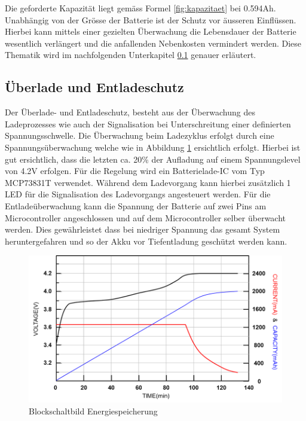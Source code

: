 Die geforderte Kapazität liegt gemäss Formel \ref{fig:kapazitaet} bei 0.594Ah. Unabhängig von der Grösse der Batterie ist der Schutz vor äusseren Einflüssen. Hierbei kann mittels einer gezielten Überwachung die Lebensdauer der Batterie wesentlich verlängert und die anfallenden Nebenkosten vermindert werden. Diese Thematik wird im nachfolgenden Unterkapitel \ref{Überlade und Entladeschutz} genauer erläutert.
                                         
\subsection{Überlade und Entladeschutz}  \label{Überlade und Entladeschutz}

Der Überlade- und Entladeschutz, besteht aus der Überwachung des Ladeprozesses wie auch der Signalisation bei Unterschreitung einer definierten Spannungsschwelle. Die Überwachung beim Ladezyklus erfolgt durch eine Spannungsüberwachung welche wie in Abbildung \ref{fig:Ladekurve Li-Ion Akku} ersichtlich erfolgt. Hierbei ist gut ersichtlich, dass die letzten ca. 20\% der Aufladung auf einem Spannungslevel von 4.2V erfolgen. Für die Regelung wird ein Batterielade-IC vom Typ MCP73831T verwendet.
Während dem Ladevorgang kann hierbei zusätzlich 1 LED für die Signalisation des Ladevorgangs angesteuert werden. Für die Entladeüberwachung kann die Spannung der Batterie auf zwei Pins am Microcontroller angeschlossen und auf dem Microcontroller selber überwacht werden. Dies gewährleistet dass bei niedriger Spannung das gesamt System heruntergefahren und so der Akku vor Tiefentladung geschützt werden kann.

\begin{figure}[H]
	\begin{center}
		\includegraphics[width=120mm]{data/LadekurveLiIon.png}
		\caption{Blockschaltbild Energiespeicherung} %
		\label{fig:Ladekurve Li-Ion Akku}
	\end{center}
\end{figure}
